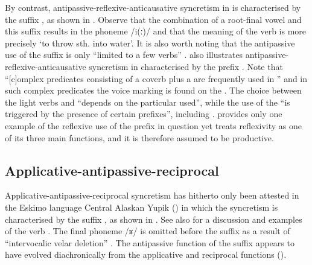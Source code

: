 By contrast, antipassive-reflexive-anticausative syncretism in  is characterised by the suffix , as shown in . Observe that the combination of a root-final vowel and this suffix results in the phoneme /i(ː)/ \citep[98ff.]{heath:1984} and that the meaning of the verb  is more precisely ‘to throw sth. into water’. It is also worth noting that the antipassive use of the suffix  is only “limited to a few verbs” \citep[390]{heath:1984}.  also illustrates anti\-pas\-sive-re\-flex\-ive-anti\-cau\-sative syncretism in  characterised by the prefix . Note that “[c]omplex predicates consisting of a coverb plus a  are frequently used in ” \citep[310]{loughnane:2009} and in such complex predicates the voice marking is found on the . The choice between the light verbs  and  “depends on the particular  used”, while the use of the   “is triggered by the presence of certain prefixes”, including  \citep[323]{loughnane:2009}. \citet[238ff.]{loughnane:2009} provides only one example of the reflexive use of the prefix in question yet treats reflexivity as one of its three main functions, and it is therefore assumed to be productive.

\subsection{Applicative-antipassive-reciprocal} \label{sec:complex-syncretism:appl-antp-recp}
Applicative-antipassive-reciprocal syncretism has hitherto only been attested in the Eskimo language Central Alaskan Yupik () in which the syncretism is characterised by the suffix , as shown in . See also \citet[96ff.]{mithun:2000} for a discussion and examples of the verb . The final phoneme  /ʁ/ is omitted before the suffix  as a result of “intervocalic velar deletion” \citep[211f.]{miyaoka:2012}. The antipassive function of the suffix  appears to have evolved diachronically from the applicative and reciprocal functions (). 


